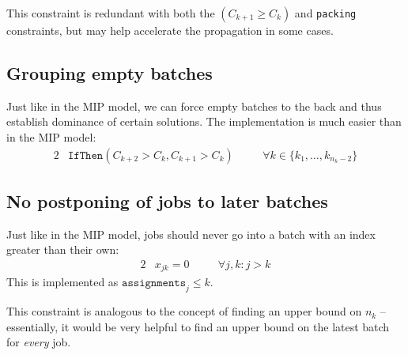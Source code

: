 This constraint is redundant with both the $(C_{k+1}\geq C_k)$ and
\texttt{packing} constraints, but may help accelerate the propagation in some
cases.

\subsection{Grouping empty batches} Just like in the MIP model, we can force
empty batches to the back and thus establish dominance of certain solutions. The
implementation is much easier than in the MIP model: \begin{alignat}{2} &
\mathtt{IfThen}( C_{k+2} > C_{k}, C_{k+1} > C_{k} ) \quad && \forall k \in
\{k_1, \dots, k_{n_k-2}\} \end{alignat}

\subsection{No postponing of jobs to later batches} Just like in the MIP model,
jobs should never go into a batch with an index greater than their own:
\begin{alignat}{2} & x_{jk} = 0 \quad && \forall j,k : j > k \end{alignat} This
is implemented as $\mathtt{assignments}_j \leq k$. 

{\color{darkred} This constraint is analogous to the concept of finding an upper
bound on $n_k$ -- essentially, it would be very helpful to find an upper bound
on the latest batch for \textit{every} job.}


